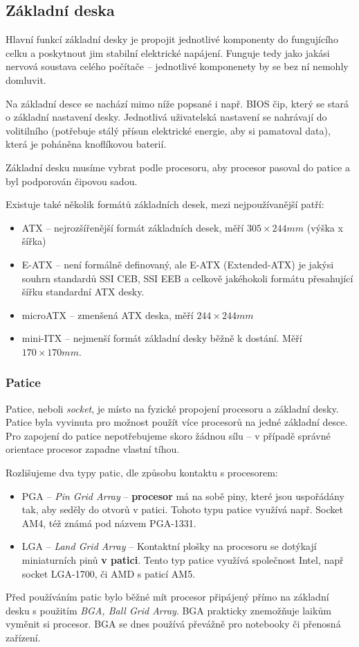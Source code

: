 \documentclass[a4paper]{article}
\begin{document}
    \subsection{Základní deska}
        Hlavní funkcí základní desky je propojit jednotlivé komponenty do fungujícího celku a poskytnout jim stabilní elektrické napájení. Funguje tedy jako jakási nervová soustava celého počítače -- jednotlivé komponenety by se bez ní nemohly domluvit. \par Na základní desce se nachází mimo níže popsané i např. BIOS čip, který se stará o základní nastavení desky. Jednotlivá uživatelská nastavení se nahrávají do volitilního (potřebuje stálý přísun elektrické energie, aby si pamatoval data), která je poháněna knoflíkovou baterií. \par
        Základní desku musíme vybrat podle procesoru, aby procesor pasoval do patice a byl podporován čipovou sadou.
        \par
        Existuje také několik formátů základních desek, mezi nejpoužívanější patří:
        \begin{itemize}
            \item ATX -- nejrozšířenější formát základních desek, měří $305 \times 244 mm$ (výška x šířka)
            \item E-ATX -- není formálně definovaný, ale E-ATX (Extended-ATX) je jakýsi souhrn standardů SSI CEB, SSI EEB a celkově jakéhokoli formátu přesahující šířku standardní ATX desky.
            \item microATX -- zmenšená ATX deska, měří $244 \times 244 mm$
            \item mini-ITX -- nejmenší formát základní desky běžně k dostání. Měří $170 \times 170 mm$.
        \end{itemize}
        \subsubsection{Patice}
            Patice, neboli \textit{socket}, je místo na fyzické propojení procesoru a základní desky. Patice byla vyvinuta pro možnost použít více procesorů na jedné základní desce. Pro zapojení do patice nepotřebujeme skoro žádnou sílu -- v případě správné orientace procesor zapadne vlastní tíhou. \par Rozlišujeme dva typy patic, dle způsobu kontaktu s procesorem:
            \begin{itemize}
                \item PGA -- \textit{Pin Grid Array} -- \textbf{procesor} má na sobě piny, které jsou uspořádány tak, aby seděly do otvorů v patici. Tohoto typu patice využívá např. Socket AM4, též známá pod názvem PGA-1331.
                \item LGA -- \textit{Land Grid Array} -- Kontaktní plošky na procesoru se dotýkají miniaturních pinů \textbf{v patici}. Tento typ patice využívá společnost Intel, např socket LGA-1700, či AMD s paticí AM5.
            \end{itemize}
            Před používáním patic bylo běžné mít procesor připájený přímo na základní desku s použitím \textit{BGA, Ball Grid Array}. BGA prakticky znemožňuje laikům vyměnit si procesor. BGA se dnes používá převážně pro notebooky či přenosná zařízení.
\end{document}
